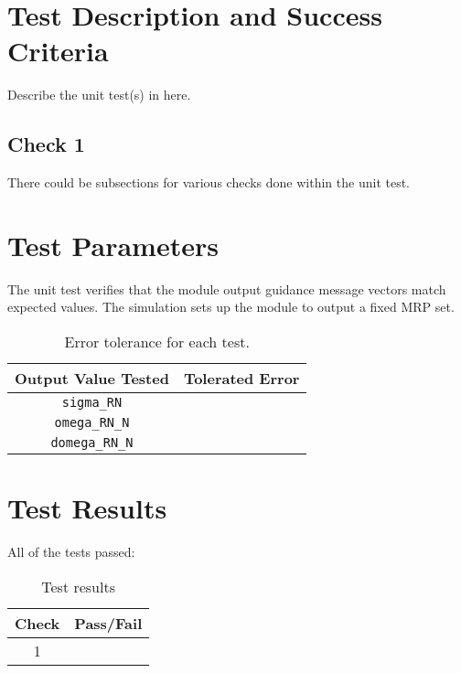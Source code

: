 
\section{Test Description and Success Criteria}
Describe the unit test(s) in here.

\subsection{Check 1}
There could be subsections for various checks done within the unit test.





\section{Test Parameters}

The unit test verifies that the module output guidance message vectors match expected values.  The simulation sets up the module to output a fixed MRP set.  

\begin{table}[htbp]
	\caption{Error tolerance for each test.}
	\label{tab:errortol}
	\centering \fontsize{10}{10}\selectfont
	\begin{tabular}{ c | c } %
		\hline\hline
		\textbf{Output Value Tested}  & \textbf{Tolerated Error}  \\ 
		\hline
		{\tt sigma\_RN}        & 	   \\ 
		{\tt omega\_RN\_N}        & 	   \\ 
		{\tt domega\_RN\_N}        & 	   \\ 
		\hline\hline
	\end{tabular}
\end{table}




\section{Test Results}
All of the tests passed:
\begin{table}[H]
	\caption{Test results}
	\label{tab:results}
	\centering \fontsize{10}{10}\selectfont
	\begin{tabular}{c | c  } %
		\hline\hline
		\textbf{Check} 						  		&\textbf{Pass/Fail} \\ 
		\hline
	   1	   			&  \\ 
	   \hline\hline
	\end{tabular}
\end{table}



